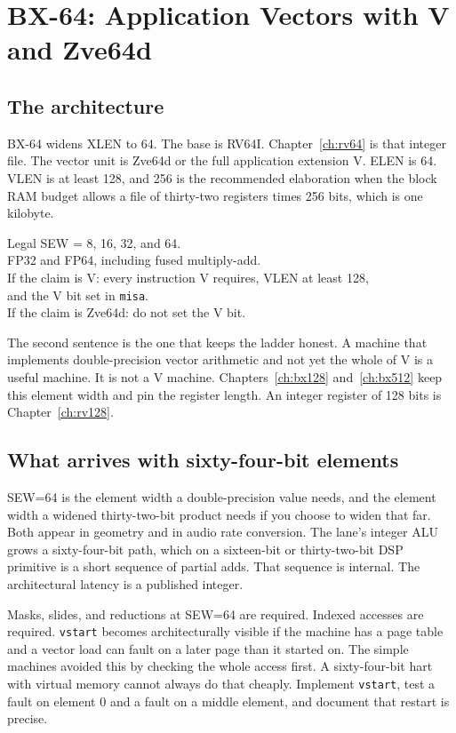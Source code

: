 \chapter{BX-64: Application Vectors with V and Zve64d}
\label{ch:bx64}

\section{The architecture}

BX-64 widens XLEN to 64. The base is RV64I. Chapter~\ref{ch:rv64} is that integer file. The vector unit is Zve64d or the full application extension V. ELEN is 64. VLEN is at least 128, and 256 is the recommended elaboration when the block RAM budget allows a file of thirty-two registers times 256 bits, which is one kilobyte.

\begin{spec}
Legal SEW = 8, 16, 32, and 64.\\
FP32 and FP64, including fused multiply-add.\\
If the claim is V: every instruction V requires, VLEN at least 128,\\
and the V bit set in \texttt{misa}.\\
If the claim is Zve64d: do not set the V bit.
\end{spec}

The second sentence is the one that keeps the ladder honest. A machine that implements double-precision vector arithmetic and not yet the whole of V is a useful machine. It is not a V machine. Chapters~\ref{ch:bx128} and~\ref{ch:bx512} keep this element width and pin the register length. An integer register of 128 bits is Chapter~\ref{ch:rv128}.

\section{What arrives with sixty-four-bit elements}

SEW=64 is the element width a double-precision value needs, and the element width a widened thirty-two-bit product needs if you choose to widen that far. Both appear in geometry and in audio rate conversion. The lane's integer ALU grows a sixty-four-bit path, which on a sixteen-bit or thirty-two-bit DSP primitive is a short sequence of partial adds. That sequence is internal. The architectural latency is a published integer.

Masks, slides, and reductions at SEW=64 are required. Indexed accesses are required. \texttt{vstart} becomes architecturally visible if the machine has a page table and a vector load can fault on a later page than it started on. The simple machines avoided this by checking the whole access first. A sixty-four-bit hart with virtual memory cannot always do that cheaply. Implement \texttt{vstart}, test a fault on element 0 and a fault on a middle element, and document that restart is precise.

